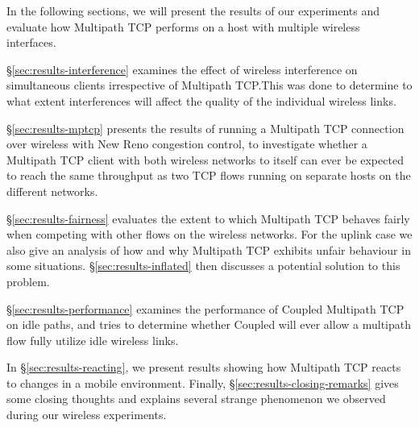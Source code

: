In the following sections, we will present the results of our experiments and
evaluate how Multipath TCP performs on a host with multiple wireless
interfaces.

\S\ref{sec:results-interference} examines the effect of wireless
interference on simultaneous clients irrespective of Multipath TCP.\@ This was
done to determine to what extent interferences will affect the quality of the
individual wireless links.

\S\ref{sec:results-mptcp} presents the results of running a Multipath TCP
connection over wireless with New Reno congestion control, to investigate whether
a Multipath TCP client with both wireless networks to
itself can ever be expected to reach the same throughput as two TCP flows running on
separate hosts on the different networks.

\S\ref{sec:results-fairness} evaluates the extent to which Multipath TCP behaves
fairly when competing with other flows on the wireless networks. For the uplink
case we also give an analysis of how and why Multipath TCP exhibits unfair
behaviour in some situations. \S\ref{sec:results-inflated} then discusses a
potential solution to this problem.

\S\ref{sec:results-performance} examines the performance of Coupled Multipath
TCP on idle paths, and tries to determine whether Coupled will ever allow a
multipath flow fully utilize idle wireless links.

In \S\ref{sec:results-reacting}, we present results showing how Multipath TCP
reacts to changes in a mobile environment. Finally,
\S\ref{sec:results-closing-remarks} gives some closing thoughts and explains
several strange phenomenon we observed during our wireless experiments.
